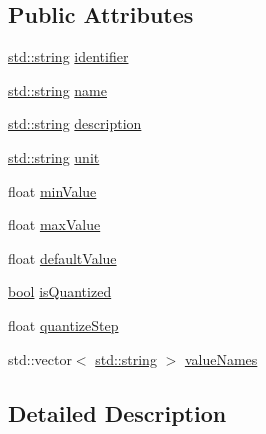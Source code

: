 \subsection*{Public Attributes}
\begin{DoxyCompactItemize}
\item 
\hyperlink{test__lib_f_l_a_c_2format_8c_ab02026ad0de9fb6c1b4233deb0a00c75}{std\+::string} \hyperlink{struct_vamp_1_1_plugin_base_1_1_parameter_descriptor_a116fd9f0dc94c2bc4bbc60b5443c598c}{identifier}
\item 
\hyperlink{test__lib_f_l_a_c_2format_8c_ab02026ad0de9fb6c1b4233deb0a00c75}{std\+::string} \hyperlink{struct_vamp_1_1_plugin_base_1_1_parameter_descriptor_a0ecebb94fb4ada4aad2640e20aa57084}{name}
\item 
\hyperlink{test__lib_f_l_a_c_2format_8c_ab02026ad0de9fb6c1b4233deb0a00c75}{std\+::string} \hyperlink{struct_vamp_1_1_plugin_base_1_1_parameter_descriptor_a780ddad41e433d85c82f9ea4d959cbaf}{description}
\item 
\hyperlink{test__lib_f_l_a_c_2format_8c_ab02026ad0de9fb6c1b4233deb0a00c75}{std\+::string} \hyperlink{struct_vamp_1_1_plugin_base_1_1_parameter_descriptor_a3bc3df322e4c02e17e96bc6d44982d7b}{unit}
\item 
float \hyperlink{struct_vamp_1_1_plugin_base_1_1_parameter_descriptor_ab3e4d84f5bc199eea8b642b27e425ec8}{min\+Value}
\item 
float \hyperlink{struct_vamp_1_1_plugin_base_1_1_parameter_descriptor_ab934b20dd708228a0e3c2811a3e2cec4}{max\+Value}
\item 
float \hyperlink{struct_vamp_1_1_plugin_base_1_1_parameter_descriptor_aec4ef77451ec02193ecc4a0856673fbc}{default\+Value}
\item 
\hyperlink{mac_2config_2i386_2lib-src_2libsoxr_2soxr-config_8h_abb452686968e48b67397da5f97445f5b}{bool} \hyperlink{struct_vamp_1_1_plugin_base_1_1_parameter_descriptor_a7c556d58d552f737ee5a34efdf7f9425}{is\+Quantized}
\item 
float \hyperlink{struct_vamp_1_1_plugin_base_1_1_parameter_descriptor_a01f8387e7c853d5e4e35d4e9a37353d7}{quantize\+Step}
\item 
std\+::vector$<$ \hyperlink{test__lib_f_l_a_c_2format_8c_ab02026ad0de9fb6c1b4233deb0a00c75}{std\+::string} $>$ \hyperlink{struct_vamp_1_1_plugin_base_1_1_parameter_descriptor_a94df96f53835980b4739965007ff222b}{value\+Names}
\end{DoxyCompactItemize}


\subsection{Detailed Description}


